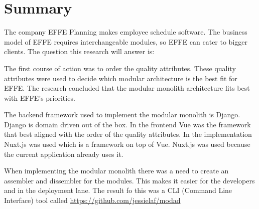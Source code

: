 \chapter{Summary}

The company EFFE Planning makes employee schedule software. The business model of EFFE requires interchangeable modules, so EFFE can cater to bigger clients.
The question this research will answer is:


The first course of action was to order the quality attributes. These quality attributes were used to decide which modular architecture is the best fit for EFFE. The research concluded that the modular monolith architecture fits best with EFFE's priorities.

The backend framework used to implement the modular monolith is Django. Django is domain driven out of the box. In the frontend Vue was the framework that best aligned with the order of the quality attributes. In the implementation Nuxt.js was used which is a framework on top of Vue. Nuxt.js was used because the current application already uses it.

When implementing the modular monolith there was a need to create an assembler and dissembler for the modules. This makes it easier for the developers and in the deployment lane. The result fo this was a CLI (Command Line Interface) tool called \href{modad}{https://github.com/jessielaf/modad}
